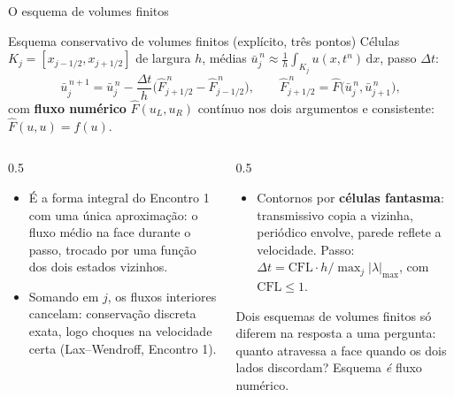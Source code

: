 \documentclass[aspectratio=169,10pt]{beamer}
\newcommand{\dd}{\mathrm{d}}
\newcommand{\Fh}{\widehat F}
\newcommand{\ub}{\bar u}
\begin{document}
\begin{frame}{O esquema de volumes finitos}
\begin{definicao}{Esquema conservativo de volumes finitos (explícito, três pontos)}
Células $K_j=[x_{j-1/2},x_{j+1/2}]$ de largura $h$, médias $\ub_j^{\,n}\approx\frac1h\int_{K_j}u(x,t^n)\,\dd x$, passo $\Delta t$:
\[
\ub_j^{\,n+1}=\ub_j^{\,n}-\frac{\Delta t}{h}\Big(\Fh_{j+1/2}^{\,n}-\Fh_{j-1/2}^{\,n}\Big),\qquad
\Fh_{j+1/2}^{\,n}=\Fh\big(\ub_j^{\,n},\ub_{j+1}^{\,n}\big),
\]
com \textbf{fluxo numérico} $\Fh(u_L,u_R)$ contínuo nos dois argumentos e consistente: $\Fh(u,u)=f(u)$.
\end{definicao}
\begin{columns}[T]
\begin{column}{0.5\textwidth}
\begin{itemize}
\item É a forma integral do Encontro 1 com uma única aproximação: o fluxo médio na face durante o passo, trocado por uma função dos dois estados vizinhos.
\item Somando em $j$, os fluxos interiores cancelam: conservação discreta exata, logo choques na velocidade certa (Lax--Wendroff, Encontro 1).
\end{itemize}
\end{column}
\begin{column}{0.5\textwidth}
\begin{itemize}
\item Contornos por \textbf{células fantasma}: transmissivo copia a vizinha, periódico envolve, parede reflete a velocidade. Passo: $\Delta t=\mathrm{CFL}\cdot h/\max_j|\lambda|_{\max}$, com $\mathrm{CFL}\le1$.
\end{itemize}
\begin{intuicao}
Dois esquemas de volumes finitos só diferem na resposta a uma pergunta: quanto atravessa a face quando os dois lados discordam? Esquema \emph{é} fluxo numérico.
\end{intuicao}
\end{column}
\end{columns}
\end{frame}
\end{document}
